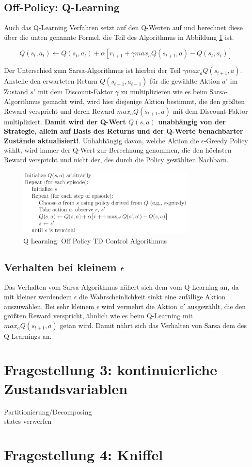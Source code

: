 \documentclass[10pt]{scrartcl}
\begin{document}
\subsection{Off-Policy: Q-Learning}
Auch das Q-Learning Verfahren setzt auf den Q-Werten auf und berechnet diese über die unten genannte Formel, die Teil des Algorithmus in Abbildung \ref{fig:QLearning} ist.

\begin{equation}
Q(s_{t},a_{t}) \leftarrow Q(s_{t},a_{t}) + \alpha [r_{t+1} + \gamma max_{a} Q(s_{t+1},a) - Q(s_{t},a_{t})]
\end{equation} 

Der Unterschied zum Sarsa-Algorithmus ist hierbei der Teil $\gamma max_{a} Q(s_{t+1},a)$. Anstelle den erwarteten Return $Q(s_{t+1},a_{t+1})$ für die gewählte Aktion $a'$ im Zustand $s'$ mit dem Discount-Faktor $\gamma$ zu multiplizieren wie es beim Sarsa-Algorithmus gemacht wird, wird hier diejenige Aktion bestimmt, die den größten Reward verspricht und deren Reward $max_{a} Q(s_{t+1},a)$ mit dem Discount-Faktor multipliziert. \textbf{Damit wird der Q-Wert $Q(s,a)$ unabhängig von der Strategie, allein auf Basis des Returns und der Q-Werte benachbarter Zustände aktualisiert!}. 
Unhabhängig davon, welche Aktion die $\epsilon$-Greedy Policy wählt, wird immer der Q-Wert zur Berechnung genommen, die den höchsten Reward verspricht und nicht der, des durch die Policy gewählten Nachbarn. 

\begin{figure}[htbp]
	\centering	\includegraphics[width=0.8\textwidth]{Bilder/Q-Learning.png}
	\caption{Q Learning: Off Policy TD Control Algorithmus}
	\label{fig:QLearning}
\end{figure}


\subsection{Verhalten bei kleinem $\epsilon$}
Das Verhalten vom Sarsa-Algorithmus nähert sich dem vom Q-Learning an, da mit kleiner werdendem $\epsilon$ die Wahrscheinlichkeit sinkt eine zufällige Aktion auszuwählen. Bei sehr kleinem $\epsilon$ wird vermehrt die Aktion $a'$ ausgewählt, die den größten Reward verspricht, ähnlich wie es beim Q-Learning mit $max_{a} Q(s_{t+1},a)$ getan wird. Damit nährt sich das Verhalten von Sarsa dem des Q-Learnings an.

\section{Fragestellung 3: kontinuierliche Zustandsvariablen}
Partitionierung/Decomposing\\
states verwerfen


\section{Fragestellung 4: Kniffel}


\listoftodos
\end{document}
